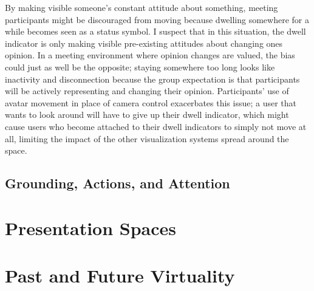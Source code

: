 By making visible someone's constant attitude about something, meeting participants might be discouraged from moving because dwelling somewhere for a while becomes seen as a status symbol. I suspect that in this situation, the dwell indicator is only making visible pre-existing attitudes about changing ones opinion. In a meeting environment where opinion changes are valued, the bias could just as well be the opposite; staying somewhere too long looks like inactivity and disconnection because the group expectation is that participants will be actively representing and changing their opinion. Participants' use of avatar movement in place of camera control exacerbates this issue; a user that wants to look around will have to give up their dwell indicator, which might cause users who become attached to their dwell indicators to simply not move at all, limiting the impact of the other visualization systems spread around the space. 

\subsection{Grounding, Actions, and Attention}

% 



\section{Presentation Spaces}


\section{Past and Future Virtuality}